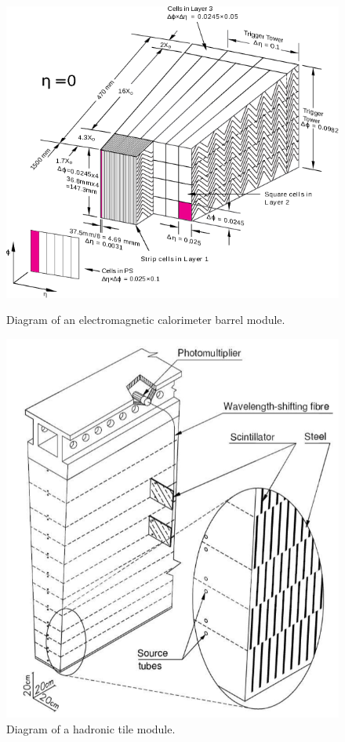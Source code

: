 \begin{figure}[h]
\begin{minipage}[b]{0.48\textwidth}
\includegraphics[width=\textwidth]{fig/atlas/caloModule}
\caption{Diagram of an electromagnetic calorimeter barrel module\cite{cern-jinst-atlas}.}
\label{fig:caloModule}
\end{minipage}
\hfill
\begin{minipage}[b]{0.48\textwidth}
\includegraphics[width=\textwidth]{fig/atlas/tile}
\caption{Diagram of a hadronic tile module\cite{cern-jinst-atlas}.}
\label{fig:tileModule}
\end{minipage}
\end{figure}
